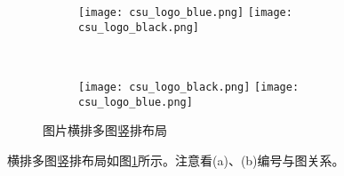 \begin{figure}[!htb]
    \centering
    \begin{subfigure}[t]{0.3\linewidth}
        \captionsetup{justification=centering} 
        \begin{minipage}[b]{1\linewidth}
        \texttt{[image: csu\_logo\_blue.png]}
        \texttt{[image: csu\_logo\_black.png]}
        \caption{}
        \end{minipage}
    \end{subfigure}\\
    \begin{subfigure}[t]{0.3\linewidth}
        \captionsetup{justification=centering} 
        \begin{minipage}[b]{1\linewidth}
        \texttt{[image: csu\_logo\_black.png]}
        \texttt{[image: csu\_logo\_blue.png]}
        \caption{}
        \end{minipage}
    \end{subfigure}
    \caption{图片横排多图竖排布局}
    \label{f.csu_row_col}
\end{figure}

横排多图竖排布局如图\ref{f.csu_row_col}所示。注意看(a)、(b)编号与图关系。

\newpage
